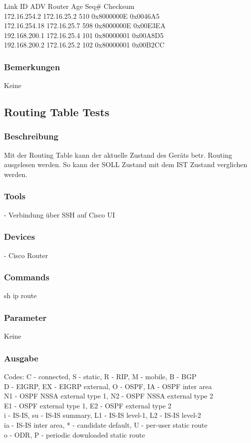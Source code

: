\documentclass[a4,12pt]{scrartcl}
\begin{document}
\noindent Link ID         ADV Router      Age         Seq#       Checksum\\
172.16.254.2    172.16.25.2     510         0x8000000E 0x0046A5\\
172.16.254.18   172.16.25.7     598         0x8000000E 0x00E3EA\\
192.168.200.1   172.16.25.4     101         0x80000001 0x00A8D5\\
192.168.200.2   172.16.25.2     102         0x80000001 0x00B2CC
\subsubsection{Bemerkungen}
Keine

\subsection{Routing Table Tests}
\subsubsection{Beschreibung}
Mit der Routing Table kann der aktuelle Zustand des Geräts betr. Routing ausgelesen werden. So kann der SOLL Zustand mit dem IST Zustand verglichen werden.
\subsubsection{Tools}
- Verbindung über SSH auf Cisco UI
\subsubsection{Devices}
- Cisco Router
\subsubsection{Commands}
sh ip route
\subsubsection{Parameter}
Keine
\subsubsection{Ausgabe}
Codes: C - connected, S - static, R - RIP, M - mobile, B - BGP\\
       D - EIGRP, EX - EIGRP external, O - OSPF, IA - OSPF inter area\\
       N1 - OSPF NSSA external type 1, N2 - OSPF NSSA external type 2\\
       E1 - OSPF external type 1, E2 - OSPF external type 2\\
       i - IS-IS, su - IS-IS summary, L1 - IS-IS level-1, L2 - IS-IS level-2\\
       ia - IS-IS inter area, * - candidate default, U - per-user static route\\
       o - ODR, P - periodic downloaded static route\\
\end{document}
